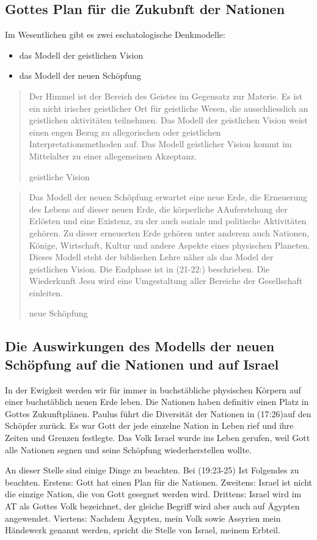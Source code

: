 \documentclass{../../inc/mybib}
\begin{document}
\subsection{Gottes Plan für die Zukubnft der Nationen}
Im Wesentlichen gibt es zwei eschatologische Denkmodelle:
\begin{itemize}
    \item das Modell der geistlichen Vision
    \item das Modell der neuen Schöpfung
\end{itemize}
\blockquote[geistliche Vision]{Der Himmel ist der Bereich des Geistes im Gegensatz zur Materie. Es ist ein nicht irischer geistlicher Ort für geistliche Wesen, die ausschliesslich an geistlichen aktivitäten teilnehmen. Das Modell der geistlichen Vision weist einen engen Bezug zu allegorischen oder geistlichen Interpretationsmethoden auf. Das Modell geistlicher Vision kommt im Mittelalter zu einer allegemeinen Akzeptanz.}
\blockquote[neue Schöpfung]{Das Modell der neuen Schöpfung erwartet eine neue Erde, die Erneuerung des Lebens auf dieser neuen Erde, die körperliche AAuferstehung der Erlösten und eine Existenz, zu der auch soziale und politische Aktivitäten gehören. Zu dieser erneuerten Erde gehören unter anderem auch Nationen, Könige, Wirtschaft, Kultur und andere Aspekte eines physischen Planeten. Dieses Modell steht der biblischen Lehre näher als das Model der geistlichen Vision. Die Endphase ist in (21-22:) beschrieben. Die Wiederkunft Jesu wird eine Umgestaltung aller Bereiche der Gesellschaft einleiten.}
\subsection{Die Auswirkungen des Modells der neuen Schöpfung auf die Nationen und auf Israel}
In der Ewigkeit werden wir für immer in buchstäbliche physischen Körpern auf einer buchstäblich neuen Erde leben. Die Nationen haben definitiv einen Platz in Gottes Zukunftplänen. Paulus führt die Diversität der Nationen in (17:26)auf den Schöpfer zurück. Es war Gott der jede einzelne Nation in Leben rief und ihre Zeiten und Grenzen festlegte. Das Volk Israel wurde ins Leben gerufen, weil Gott alle Nationen segnen und seine Schöpfung wiederherstellen wollte.

An dieser Stelle sind einige Dinge zu beachten. 
Bei (19:23-25) Ist Folgendes zu beachten. Erstens: Gott hat einen Plan für die Nationen. Zweitens: Israel ist nicht die einzige Nation, die von Gott gesegnet werden wird. Drittens: Israel wird im AT als Gottes Volk bezeichnet, der gleiche Begriff wird aber auch auf Ägypten angewendet. Viertens: Nachdem Ägypten, mein Volk sowie Assyrien mein Händewerk genannt werden, spricht die Stelle von Israel, meinem Erbteil.
\end{document}
